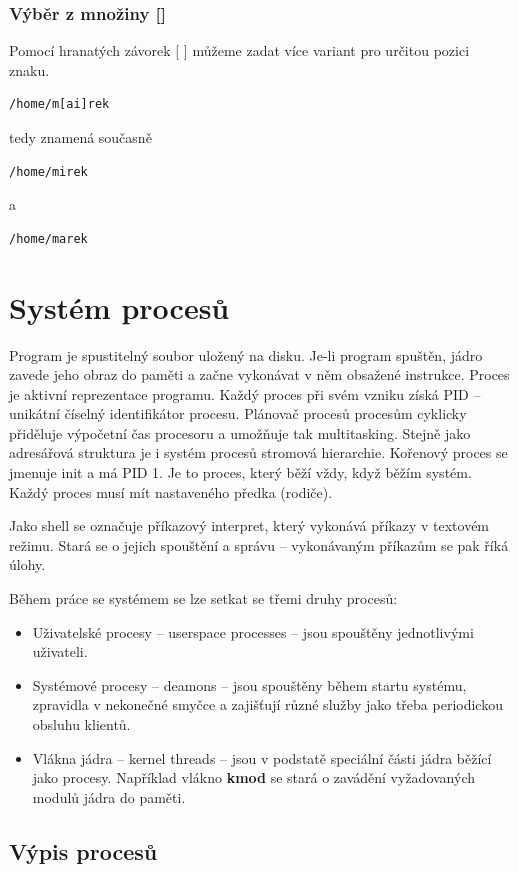 \documentclass{article}
\begin{document}
\subsubsection{Výběr z množiny []}
Pomocí hranatých závorek [ ] můžeme zadat více variant pro určitou pozici znaku. 
\begin{verbatim}
/home/m[ai]rek
\end{verbatim} 
tedy znamená současně 
\begin{verbatim}
/home/mirek
\end{verbatim} 
a 
\begin{verbatim}
/home/marek
\end{verbatim} 

\section{Systém procesů}
Program je spustitelný soubor uložený na disku. Je-li program spuštěn, jádro zavede jeho obraz do paměti a začne vykonávat v něm obsažené instrukce. Proces je aktivní reprezentace programu. Každý proces při svém vzniku získá PID -- unikátní číselný identifikátor procesu. Plánovač procesů procesům cyklicky přiděluje výpočetní čas procesoru a umožňuje tak multitasking. Stejně jako adresářová struktura je i systém procesů stromová hierarchie. Kořenový proces se jmenuje init a má PID 1. Je to proces, který běží vždy, když běžím systém. Každý proces musí mít nastaveného předka (rodiče).

Jako shell se označuje příkazový interpret, který vykonává příkazy v textovém režimu. Stará se o jejich spouštění a správu -- vykonávaným příkazům se pak říká úlohy.

Během práce se systémem se lze setkat se třemi druhy procesů:
\begin{itemize}
\item Uživatelské procesy -- userspace processes -- jsou spouštěny jednotlivými uživateli.
\item Systémové procesy -- deamons -- jsou spouštěny během startu systému, zpravidla v nekonečné smyčce a zajišťují různé služby jako třeba periodickou obsluhu klientů.
\item Vlákna jádra -- kernel threads -- jsou v podstatě speciální části jádra běžící jako procesy. Například vlákno \textbf{kmod} se stará o zavádění vyžadovaných modulů jádra do paměti.
\end{itemize}

\subsection{Výpis procesů}
\end{document}
